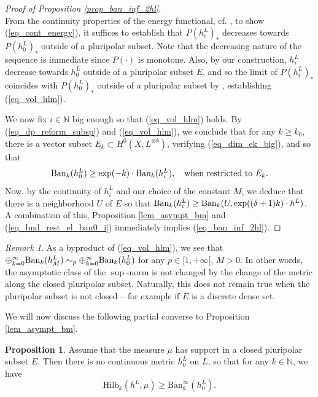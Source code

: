 \documentclass[12pt]{article}
\numberwithin{equation}{section}
\theoremstyle{theorem}
\theoremstyle{definition}
\newtheorem{prop}[thm]{Proposition}
\theoremstyle{remark}
\newtheorem{rem}[thm]{Remark}
\newcommand{\nat}{\mathbb{N}}
\begin{document}
\begin{proof}[Proof of Proposition \ref{prop_ban_inf_2hl}]
\begin{equation}
		\end{equation}
		From the continuity properties of the energy functional, cf. \cite[Proposition 3.3]{BermanBouckBalls}, to show (\ref{eq_cont_energy}), it suffices to establish that $P(h^L_i)_*$ decreases towards $P(h^L_0)_*$ outside of a pluripolar subset.
		Note that the decreasing nature of the sequence is immediate since $P(\cdot)$ is monotone.
		Also, by our construction, $h^L_i$ decrease towards $h^L_0$ outside of a pluripolar subset $E$, and so the limit of $P(h^L_i)_*$ coincides with $P(h^L_0)_*$ outside of a pluripolar subset by  \cite[Proposition 2.2.3]{GuedjLuZeriahEnv}, establishing (\ref{eq_vol_hlm}).
		\par
		We now fix $i \in \nat$ big enough so that (\ref{eq_vol_hlm}) holds.
		By (\ref{eq_dp_reform_subsp}) and (\ref{eq_vol_hlm}), we conclude that for any $k \geq k_0$, there is a vector subset $E_k \subset H^0(X, L^{\otimes k})$, verifying (\ref{eq_dim_ek_big}), and so that 
		\begin{equation}\label{eq_bnd_rest_el_ban0_i}
			{\rm{Ban}}_k(h^L_0) \geq \exp(- k) \cdot {\rm{Ban}}_k(h^L_i), \quad \text{when restricted to } E_k.
		\end{equation}
		Now, by the continuity of $h^L_i$ and our choice of the constant $M$, we deduce that there is a neighborhood $U$ of $E$ so that ${\rm{Ban}}_k(h^L_i) \geq {\rm{Ban}}_k(U, \exp((\delta + 1) k) \cdot h^L)$.
		A combination of this, Proposition \ref{lem_asympt_bm} and (\ref{eq_bnd_rest_el_ban0_i}) immediately implies (\ref{eq_ban_inf_2hl}).
	\end{proof}
	\begin{rem}\label{rem_eq_hlm}
		As a byproduct of (\ref{eq_vol_hlm}), we see that $\oplus_{k = 0}^{\infty} {\rm{Ban}}_k(h^L_M) \sim_p \oplus_{k = 0}^{\infty} {\rm{Ban}}_k(h^L_0)$ for any $p \in [1, +\infty[$, $M > 0$. 
		In other words, the asymptotic class of the $\sup$-norm is not changed by the change of the metric along the closed pluripolar subset.
		Naturally, this does not remain true when the pluripolar subset is not closed -- for example if $E$ is a discrete dense set.
	\end{rem}
	We will now discuss the following partial converse to Proposition \ref{lem_asympt_bm}.
	\begin{prop}\label{lem_asympt_bm_pc}
		Assume that the measure $\mu$ has support in a closed pluripolar subset $E$.
		Then there is no continuous metric $h^L_0$ on $L$, so that for any $k \in \nat$, we have
		\begin{equation}\label{eq_asympt_bm_pc}
			{\textrm{Hilb}}_k(h^L, \mu)
			\geq
			{\textrm{Ban}}_k^{\infty}(h^L_0).
		\end{equation}
	\end{prop}
\end{document}
